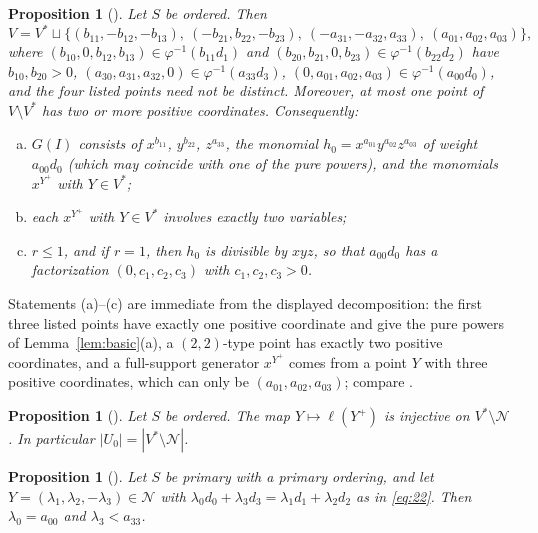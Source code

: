 \documentclass{amsart}
\newtheorem{proposition}[theorem]{Proposition}
\theoremstyle{definition}
\theoremstyle{remark}
\numberwithin{equation}{section}
\newcommand{\wt}{\ell}
\begin{document}
\begin{proposition}[{\cite[(86), Lemmas~4.1 and 4.2]{Cho26}}]\label{prop:boundary}
Let $S$ be ordered. Then
\[
V=V^*\sqcup\{(b_{11},-b_{12},-b_{13}),\ (-b_{21},b_{22},-b_{23}),\ (-a_{31},-a_{32},a_{33}),\ (a_{01},a_{02},a_{03})\},
\]
where $(b_{10},0,b_{12},b_{13})\in\varphi^{-1}(b_{11}d_1)$ and $(b_{20},b_{21},0,b_{23})\in\varphi^{-1}(b_{22}d_2)$ have $b_{10},b_{20}>0$, $(a_{30},a_{31},a_{32},0)\in\varphi^{-1}(a_{33}d_3)$, $(0,a_{01},a_{02},a_{03})\in\varphi^{-1}(a_{00}d_0)$, and the four listed points need not be distinct. Moreover, at most one point of $V\setminus V^*$ has two or more positive coordinates. Consequently:
\begin{enumerate}[(a)]
\item $G(I)$ consists of $x^{b_{11}}$, $y^{b_{22}}$, $z^{a_{33}}$, the monomial $h_0=x^{a_{01}}y^{a_{02}}z^{a_{03}}$ of weight $a_{00}d_0$ (which may coincide with one of the pure powers), and the monomials $x^{Y^+}$ with $Y\in V^*$;
\item each $x^{Y^+}$ with $Y\in V^*$ involves exactly two variables;
\item $r\le1$, and if $r=1$, then $h_0$ is divisible by $xyz$, so that $a_{00}d_0$ has a factorization $(0,c_1,c_2,c_3)$ with $c_1,c_2,c_3>0$.
\end{enumerate}
\end{proposition}

Statements (a)--(c) are immediate from the displayed decomposition: the first three listed points have exactly one positive coordinate and give the pure powers of Lemma~\ref{lem:basic}(a), a $(2,2)$-type point has exactly two positive coordinates, and a full-support generator $x^{Y^+}$ comes from a point $Y$ with three positive coordinates, which can only be $(a_{01},a_{02},a_{03})$; compare \cite[Lemma~4.2]{Cho26}.

\begin{proposition}[{\cite[Lemma~4.13]{Cho26}}]\label{prop:injective}
Let $S$ be ordered. The map $Y\mapsto\wt(Y^+)$ is injective on $V^*\setminus\mathcal N$. In particular $|U_0|=|V^*\setminus\mathcal N|$.
\end{proposition}

\begin{proposition}[{\cite[Lemma~3.8]{Cho26}}]\label{prop:N-primary}
Let $S$ be primary with a primary ordering, and let $Y=(\lambda_1,\lambda_2,-\lambda_3)\in\mathcal N$ with $\lambda_0d_0+\lambda_3d_3=\lambda_1d_1+\lambda_2d_2$ as in \eqref{eq:22}. Then $\lambda_0=a_{00}$ and $\lambda_3<a_{33}$.
\end{proposition}
\end{document}
